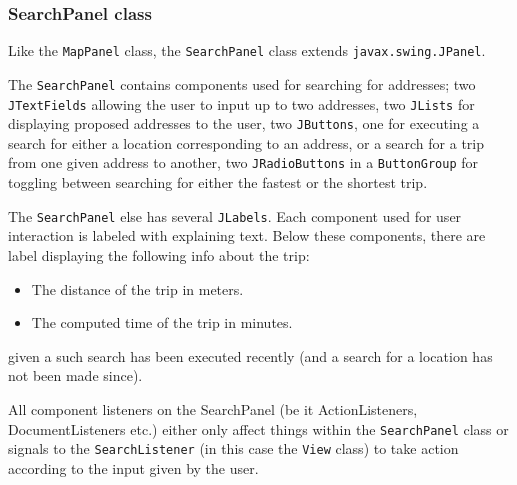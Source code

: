 \subsubsection{SearchPanel class}
Like the \texttt{MapPanel} class, the \texttt{SearchPanel} class extends \texttt{javax.swing.JPanel}.

The \texttt{SearchPanel} contains components used for searching for addresses; two \texttt{JTextFields} allowing the user to input up to two addresses, two \texttt{JLists} for displaying proposed addresses to the user, two \texttt{JButtons}, one for executing a search for either a location corresponding to an address, or a search for a trip from one given address to another, two \texttt{JRadioButtons} in a \texttt{ButtonGroup} for toggling between searching for either the fastest or the shortest trip.

The \texttt{SearchPanel} else has several \texttt{JLabels}. Each component used for user interaction is labeled with explaining text. Below these components, there are label displaying the following info about the trip:
\begin{itemize}
 \item The distance of the trip in meters.
 \item The computed time of the trip in minutes.
\end{itemize}
given a such search has been executed recently (and a search for a location has not been made since).

All component listeners on the SearchPanel (be it ActionListeners, DocumentListeners etc.) either only affect things within the \texttt{SearchPanel} class or signals to the \texttt{SearchListener} (in this case the \texttt{View} class) to take action according to the input given by the user.

